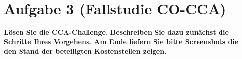 \section{Aufgabe 3 (Fallstudie CO-CCA)}
\textbf{Lösen Sie die CCA-Challenge. Beschreiben Sie dazu zunächst die Schritte Ihres Vorgehens. Am
Ende liefern Sie bitte Screenshots die den Stand der beteiligten Kostenstellen zeigen.}


\clearpage
{}

\clearpage 